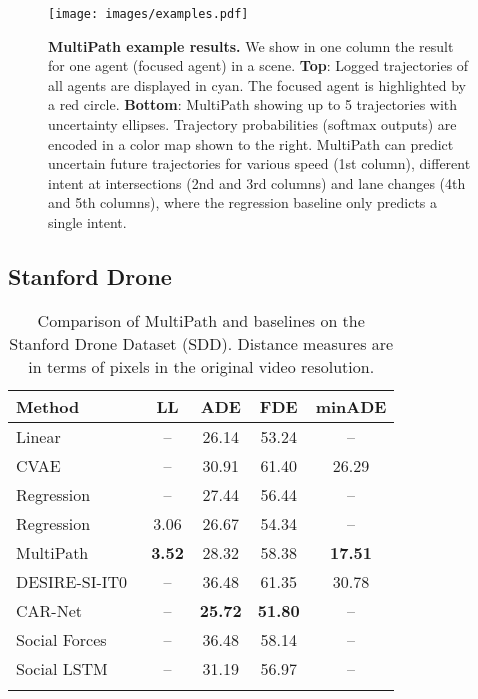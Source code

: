 \documentclass{article}
\newcommand{\multiflow}{MultiPath\xspace}
\begin{document}
\begin{figure}[tp]
  \centering
\texttt{[image: images/examples.pdf]}
\caption{\small \textbf{\multiflow example results.}
We show in one column the result for one agent (focused agent) in a scene.
\textbf{Top}: Logged trajectories of all agents are displayed in cyan. The focused agent is highlighted by a red circle. \textbf{Bottom}: \multiflow showing up to 5 trajectories with uncertainty ellipses. Trajectory probabilities (softmax outputs) are encoded in a color map shown to the right. \multiflow can predict uncertain future trajectories for various speed (1st column), different intent at intersections (2nd and 3rd columns) and lane changes (4th and 5th columns), where the regression baseline only predicts a single intent.
\vspace{-0.4cm}
}
\label{fig:examples}
\end{figure}









\subsection{Stanford Drone}
\label{sec:sdd}

\begin{table}[!tbp]
\caption{\small Comparison of \multiflow and baselines on the Stanford Drone Dataset (SDD). Distance measures are in terms of pixels in the original video resolution.}
\label{tbl:sdd}
\centering
\begin{tabular}{lcccc}
\toprule
Method & LL  & ADE   & FDE  & minADE  \\
\midrule          
Linear                               & --    & 26.14 & 53.24 & --           \\
CVAE                                 & --    & 30.91 & 61.40 & 26.29        \\
Regression                      & --    & 27.44 & 56.44 & --           \\
Regression              & 3.06  & 26.67 & 54.34 & --           \\
\multiflow              & \textbf{3.52} & 28.32 & 58.38 & \textbf{17.51}        \\
\midrule                                 
DESIRE-SI-IT0~\cite{Lee17}           & --    & 36.48 & 61.35 & 30.78        \\
CAR-Net~\cite{Sadeghian18}           & --    & \textbf{25.72} & \textbf{51.80} & --           \\
Social Forces~\cite{Yamaguchi2011}   & --    & 36.48 & 58.14 & --           \\
Social LSTM~\cite{Alahi16}           & --    & 31.19 & 56.97 & --           \\
\bottomrule
\vspace{-0.2cm}
\end{tabular}
\end{table}
\end{document}

